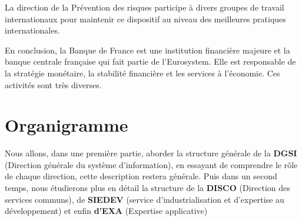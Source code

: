 \documentclass{report}
\begin{document}
La direction de la Prévention des risques participe à divers groupes de travail internationaux pour maintenir ce dispositif au niveau des meilleures pratiques internationales.

En conclusion, la Banque de France est une institution financière majeure et la banque centrale française qui fait partie de l'Eurosystem. Elle est responsable de la stratégie monétaire, la stabilité financière et les services à l'économie. Ces activités sont très diverses. 

\section{Organigramme}
Nous allons, dans une première partie, aborder la structure générale de la \textbf{DGSI} (Direction générale du système d'information), en essayant de comprendre le rôle de chaque direction, cette description restera générale. Puis dans un second temps, nous étudierons plus en détail la structure de la \textbf{DISCO} (Direction des services communs), de \textbf{SIEDEV} (service d'industrialisation et d'expertise au développement) et enfin \textbf{d'EXA} (Expertise applicative)
\end{document}
